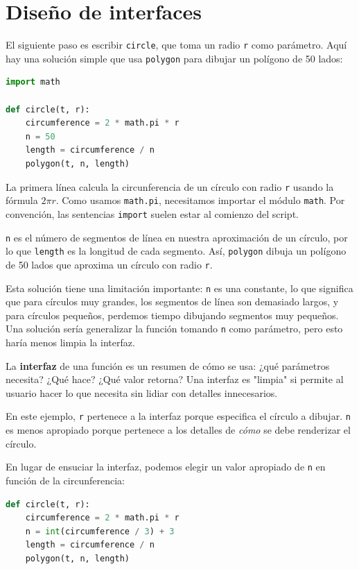 \section{Diseño de interfaces}

El siguiente paso es escribir \texttt{circle}, que toma un radio \texttt{r} como parámetro. Aquí hay una solución simple que usa \texttt{polygon} para dibujar un polígono de 50 lados:

\begin{lstlisting}[language=Python]
import math

def circle(t, r):
    circumference = 2 * math.pi * r
    n = 50
    length = circumference / n
    polygon(t, n, length)
\end{lstlisting}

La primera línea calcula la circunferencia de un círculo con radio \texttt{r} usando la fórmula $2\pi r$. Como usamos \texttt{math.pi}, necesitamos importar el módulo \texttt{math}. Por convención, las sentencias \texttt{import} suelen estar al comienzo del script.

\texttt{n} es el número de segmentos de línea en nuestra aproximación de un círculo, por lo que \texttt{length} es la longitud de cada segmento. Así, \texttt{polygon} dibuja un polígono de 50 lados que aproxima un círculo con radio \texttt{r}.

Esta solución tiene una limitación importante: \texttt{n} es una constante, lo que significa que para círculos muy grandes, los segmentos de línea son demasiado largos, y para círculos pequeños, perdemos tiempo dibujando segmentos muy pequeños. Una solución sería generalizar la función tomando \texttt{n} como parámetro, pero esto haría menos limpia la interfaz.

La \textbf{interfaz} de una función es un resumen de cómo se usa: ¿qué parámetros necesita? ¿Qué hace? ¿Qué valor retorna? Una interfaz es "limpia" si permite al usuario hacer lo que necesita sin lidiar con detalles innecesarios.

En este ejemplo, \texttt{r} pertenece a la interfaz porque especifica el círculo a dibujar. \texttt{n} es menos apropiado porque pertenece a los detalles de \textit{cómo} se debe renderizar el círculo.


En lugar de ensuciar la interfaz, podemos elegir un valor apropiado de \texttt{n} en función de la circunferencia:

\begin{lstlisting}[language=Python]
def circle(t, r):
    circumference = 2 * math.pi * r
    n = int(circumference / 3) + 3
    length = circumference / n
    polygon(t, n, length)
\end{lstlisting}

